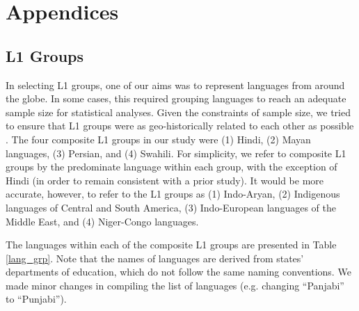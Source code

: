 \documentclass [PhD] {uclathes}
\begin{document}
\chapter{Appendices}

\section{L1 Groups}
\label{sec:appendix_lang}

In selecting L1 groups, one of our aims was to represent languages from around the globe. In some cases, this required grouping languages to reach an adequate sample size for statistical analyses. Given the constraints of sample size, we tried to ensure that L1 groups were as geo-historically related to each other as possible \citep{brown2005encyclopedia}. The four composite L1 groups in our study were (1) Hindi, (2) Mayan languages, (3) Persian, and (4) Swahili. For simplicity, we refer to composite L1 groups by the predominate language within each group, with the exception of Hindi (in order to remain consistent with a prior study). It would be more accurate, however, to refer to the L1 groups as (1) Indo-Aryan, (2) Indigenous languages of Central and South America, (3) Indo-European languages of the Middle East, and (4) Niger-Congo languages. 

The languages within each of the composite L1 groups are presented in Table \ref{lang_grp}. Note that the names of languages are derived from states’ departments of education, which do not follow the same naming conventions. We made minor changes in compiling the list of languages (e.g. changing “Panjabi” to “Punjabi”). 
\end{document}
